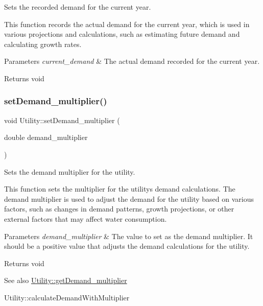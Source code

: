Sets the recorded demand for the current year. 

This function records the actual demand for the current year, which is used in various projections and calculations, such as estimating future demand and calculating growth rates.


\begin{DoxyParams}{Parameters}
{\em current\+\_\+demand} & The actual demand recorded for the current year.\\
\hline
\end{DoxyParams}
\begin{DoxyReturn}{Returns}
void 
\end{DoxyReturn}
\mbox{\label{classUtility_ad562626bc39694622495d2fb2b68ecd4}} 
\subsubsection{\texorpdfstring{set\+Demand\+\_\+multiplier()}{setDemand\_multiplier()}}
{\footnotesize\ttfamily void Utility\+::set\+Demand\+\_\+multiplier (\begin{DoxyParamCaption}\item[{double}]{demand\+\_\+multiplier }\end{DoxyParamCaption})}



Sets the demand multiplier for the utility. 

This function sets the multiplier for the utility\textquotesingle{}s demand calculations. The demand multiplier is used to adjust the demand for the utility based on various factors, such as changes in demand patterns, growth projections, or other external factors that may affect water consumption.


\begin{DoxyParams}{Parameters}
{\em demand\+\_\+multiplier} & The value to set as the demand multiplier. It should be a positive value that adjusts the demand calculations for the utility.\\
\hline
\end{DoxyParams}
\begin{DoxyReturn}{Returns}
void
\end{DoxyReturn}
\begin{DoxySeeAlso}{See also}
\mbox{\hyperlink{classUtility_a04a400d8bfb89214632f9afca8c4eef5}{Utility\+::get\+Demand\+\_\+multiplier}} 

Utility\+::calculate\+Demand\+With\+Multiplier 
\end{DoxySeeAlso}
\mbox{\label{classUtility_a6e7f1df1fcde0b14475c7045bdcaf218}} 
